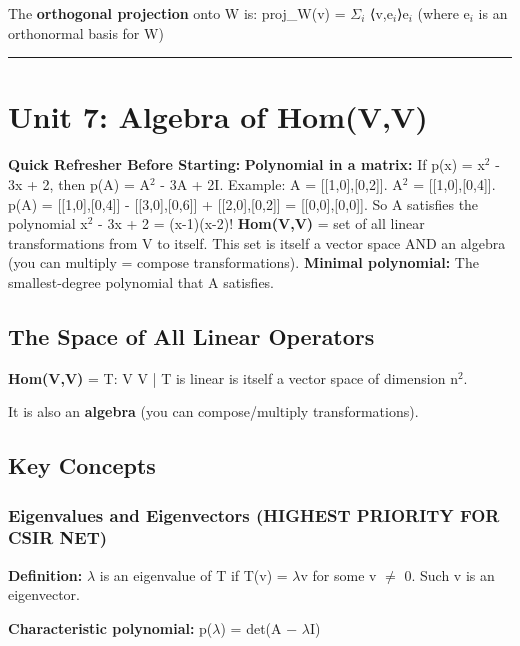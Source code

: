\documentclass[12pt,a4paper,openany]{book}
\begin{document}
{{The \textbf{orthogonal projection} onto W is: proj_W(v) = $\Sigma_i$ ⟨v,e$_i$⟩e$_i$ (where {e$_i$} is an orthonormal basis for W)

\bigskip\noindent\rule{\textwidth}{0.4pt}\bigskip

\section{Unit 7: Algebra of Hom(V,V)}

\begin{prereqbox}
 \textbf{Quick Refresher Before Starting:}
\textbf{Polynomial in a matrix:} If p(x) = x$^2$ - 3x + 2, then p(A) = A$^2$ - 3A + 2I.
Example: A = [[1,0],[0,2]]. A$^2$ = [[1,0],[0,4]]. p(A) = [[1,0],[0,4]] - [[3,0],[0,6]] + [[2,0],[0,2]] = [[0,0],[0,0]].
So A satisfies the polynomial x$^2$ - 3x + 2 = (x-1)(x-2)!
\textbf{Hom(V,V)} = set of all linear transformations from V to itself. This set is itself a vector space AND an algebra (you can multiply = compose transformations).
\textbf{Minimal polynomial:} The smallest-degree polynomial that A satisfies.
\end{prereqbox}


\subsection{The Space of All Linear Operators}

\textbf{Hom(V,V)} = {T: V  V | T is linear} is itself a vector space of dimension n$^2$.

It is also an \textbf{algebra} (you can compose/multiply transformations).

\subsection{Key Concepts}

\subsubsection{Eigenvalues and Eigenvectors  (HIGHEST PRIORITY FOR CSIR NET)}

\begin{tcolorbox}[colback=lightblue!30,colframe=defgreen,title=\textbf{Definition},breakable,boxrule=1.5pt]
\textbf{Definition:} $\lambda$ is an eigenvalue of T if T(v) = $\lambda$v for some v $\neq$ 0. Such v is an eigenvector.
\end{tcolorbox}

\textbf{Characteristic polynomial:} p($\lambda$) = det(A − $\lambda$I)

}}
\end{document}
